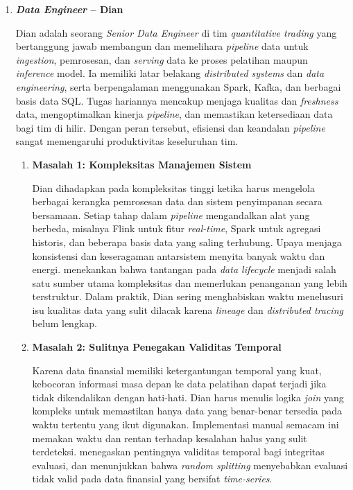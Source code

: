 \vspace{0.5em}
\begin{enumerate}
    \item \textbf{\textit{Data Engineer} -- Dian}

    Dian adalah seorang \textit{Senior Data Engineer} di tim \textit{quantitative trading} yang bertanggung jawab membangun dan memelihara \textit{pipeline} data untuk \textit{ingestion}, pemrosesan, dan \textit{serving} data ke proses pelatihan maupun \textit{inference} model. Ia memiliki latar belakang \textit{distributed systems} dan \textit{data engineering}, serta berpengalaman menggunakan Spark, Kafka, dan berbagai basis data SQL. Tugas hariannya mencakup menjaga kualitas dan \textit{freshness} data, mengoptimalkan kinerja \textit{pipeline}, dan memastikan ketersediaan data bagi tim di hilir. Dengan peran tersebut, efisiensi dan keandalan \textit{pipeline} sangat memengaruhi produktivitas keseluruhan tim.

    \vspace{0.5em}
    \begin{enumerate}[label=\alph*)]
        \item \textbf{Masalah 1: Kompleksitas Manajemen Sistem}
        
        Dian dihadapkan pada kompleksitas tinggi ketika harus mengelola berbagai kerangka pemrosesan data dan sistem penyimpanan secara bersamaan. Setiap tahap dalam \textit{pipeline} mengandalkan alat yang berbeda, misalnya Flink untuk fitur \textit{real-time}, Spark untuk agregasi historis, dan beberapa basis data yang saling terhubung. Upaya menjaga konsistensi dan keseragaman antarsistem menyita banyak waktu dan energi. \textcite{polyzotis2018data} menekankan bahwa tantangan pada \textit{data lifecycle} menjadi salah satu sumber utama kompleksitas dan memerlukan penanganan yang lebih terstruktur. Dalam praktik, Dian sering menghabiskan waktu menelusuri isu kualitas data yang sulit dilacak karena \textit{lineage} dan \textit{distributed tracing} belum lengkap.

        \vspace{0.5em}

        \item \textbf{Masalah 2: Sulitnya Penegakan Validitas Temporal}
        
        Karena data finansial memiliki ketergantungan temporal yang kuat, kebocoran informasi masa depan ke data pelatihan dapat terjadi jika tidak dikendalikan dengan hati-hati. Dian harus menulis logika \textit{join} yang kompleks untuk memastikan hanya data yang benar-benar tersedia pada waktu tertentu yang ikut digunakan. Implementasi manual semacam ini memakan waktu dan rentan terhadap kesalahan halus yang sulit terdeteksi. \textcite{polyzotis2018data} menegaskan pentingnya validitas temporal bagi integritas evaluasi, dan \textcite{wang2021leakage} menunjukkan bahwa \textit{random splitting} menyebabkan evaluasi tidak valid pada data finansial yang bersifat \textit{time-series}.


\end{enumerate}
\end{enumerate}
